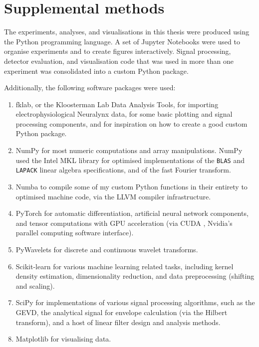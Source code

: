 
\chapter{Supplemental methods}


The experiments, analyses, and visualisations in this thesis were produced using the Python programming language. A set of Jupyter Notebooks \cite{Kluyver2016} were used to organise experiments and to create figures interactively. Signal processing, detector evaluation, and visualisation code that was used in more than one experiment was consolidated into a custom Python package.

Additionally, the following software packages were used:
\begin{enumerate}
\item fklab, or the Kloosterman Lab Data Analysis Tools, for importing electrophysiological Neuralynx data, for some basic plotting and signal processing components, and for inspiration on how to create a good custom Python package.
\item NumPy \cite{Oliphant2006} for most numeric computations and array manipulations. NumPy used the Intel MKL library \cite{intel-alt} for optimised implementations of the \texttt{BLAS} and \texttt{LAPACK} linear algebra specifications, and of the fast Fourier transform.
\item Numba \cite{Lam2015} to compile some of my custom Python functions in their entirety to optimised machine code, via the LLVM compiler infrastructure.\cite{Lattner2004}
\item PyTorch \cite{Paszke2017} for automatic differentiation, artificial neural network components, and tensor computations with GPU acceleration (via CUDA \cite{Nickolls2008}, Nvidia's parallel computing software interface).
\item PyWavelets \cite{Lee2006} for discrete and continuous wavelet transforms.
\item Scikit-learn \cite{scikit-learn} for various machine learning related tasks, including kernel density estimation, dimensionality reduction, and data preprocessing (shifting and scaling).
\item SciPy \cite{Jones2001} for implementations of various signal processing algorithms, such as the GEVD, the analytical signal for envelope calculation (via the Hilbert transform), and a host of linear filter design and analysis methods.
\item Matplotlib \cite{Hunter2007} for visualising data.
\end{enumerate}

